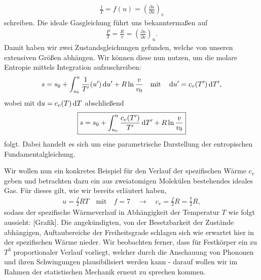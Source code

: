 \begin{align*}
    \frac{1}{T}=f(u)=\left(\frac{\partial s}{\partial u}\right)_v
\end{align*} 
schreiben. Die ideale Gasgleichung führt uns bekanntermaßen auf 
\begin{align*}
    \frac{P}{T}=\frac{R}{v}=\left(\frac{\partial s}{\partial v}\right)_u.
\end{align*}
Damit haben wir zwei Zustandsgleichungen gefunden, welche von unseren extensiven Größen abhängen.
Wir können diese nun nutzen, um die molare Entropie mittels Integration aufzuschreiben: 
\begin{align*}
    s=s_0+\int_{u_0}^u\frac{1}{T'}(u')\mathop{}\!\mathrm{d} u'+R\ln\frac{v}{v_0}\quad\text{mit}\quad\mathop{}\!\mathrm{d} u'=c_v(T')\mathop{}\!\mathrm{d} T',
\end{align*}
wobei mit $\mathop{}\!\mathrm{d} u=c_v(T)\mathop{}\!\mathrm{d} T$ abschließend 
\begin{align*}
    \boxed{s=s_0+\int_{u_0}^u\frac{c_v(T')}{T'}\mathop{}\!\mathrm{d} T'+R\ln\frac{v}{v_0}}
\end{align*}
folgt.
Dabei handelt es sich um eine parametrische Darstellung der entropischen Fundamentalgleichung.

Wir wollen nun ein konkretes Beispiel für den Verlauf der spezifischen Wärme $c_v$ geben und betrachten dazu ein aus zweiatomigen Molekülen bestehendes ideales Gas. Für dieses gilt, wie wir bereits erläutert haben, 
\begin{align*}
    u=\frac{f}{2}RT\quad\text{mit}\quad f=7\quad\rightarrow\quad c_v=\frac{f}{2}R=\frac{7}{2}R,
\end{align*} 
sodass der spezifische Wärmeverlauf in Abhängigkeit der Temperatur $T$ wie folgt aussieht: [Grafik].
Die angekündigten, von der Besetzbarkeit der Zustände abhängigen, Auftaubereiche der Freiheitsgrade schlagen sich wie erwartet hier in der spezifischen Wärme nieder. 
Wir beobachten ferner, dass für Festkörper ein zu $T^3$ proportionaler Verlauf vorliegt, welcher durch die Anschauung von Phononen und ihren Schwingungen plausibilisiert werden kann - darauf wollen wir im Rahmen der statistischen Mechanik erneut zu sprechen kommen.

